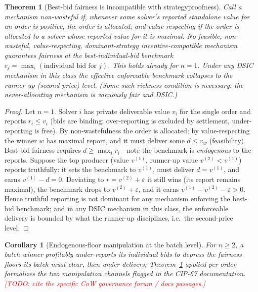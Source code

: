 \documentclass[11pt]{article}
\newcommand{\todo}[1]{\textcolor{red}{[TODO: #1]}}
\newtheorem{theorem}{Theorem}
\newtheorem{corollary}{Corollary}
\theoremstyle{remark}
\begin{document}
\begin{theorem}[Best-bid fairness is incompatible with strategyproofness]
\label{thm:incompat}
Call a mechanism \emph{non-wasteful} if, whenever some solver's reported
standalone value for an order is positive, the order is allocated; and
\emph{value-respecting} if the order is allocated to a solver whose
reported value for it is maximal. No feasible, non-wasteful,
value-respecting, dominant-strategy incentive-compatible mechanism
guarantees fairness at the best-individual-bid benchmark
$c_j=\max_i(\text{individual bid for }j)$. This holds already for $n=1$.
Under any DSIC mechanism in this class the effective enforceable benchmark
collapses to the runner-up (second-price) level. (Some such richness
condition is necessary: the never-allocating mechanism is vacuously fair
and DSIC.)
\end{theorem}

\begin{proof}
Let $n=1$. Solver $i$ has private deliverable value $v_i$ for the single
order and reports $r_i\le v_i$ (bids are binding; over-reporting is
excluded by settlement, under-reporting is free). By non-wastefulness the
order is allocated; by value-respecting the winner $w$ has maximal report,
and it must deliver some $d\le v_w$ (feasibility). Best-bid fairness
requires $d\ge\max_i r_i$---note the benchmark is \emph{endogenous} to the
reports. Suppose the top producer (value $v^{(1)}$, runner-up value
$v^{(2)}<v^{(1)}$) reports truthfully: it sets the benchmark to $v^{(1)}$,
must deliver $d=v^{(1)}$, and earns $v^{(1)}-d=0$. Deviating to
$r=v^{(2)}+\varepsilon$ it still wins (its report remains maximal), the
benchmark drops to $v^{(2)}+\varepsilon$, and it earns
$v^{(1)}-v^{(2)}-\varepsilon>0$. Hence
truthful reporting is not dominant for any mechanism enforcing the best-bid
benchmark; and in any DSIC mechanism in this class, the enforceable
delivery is bounded by what the runner-up disciplines, i.e.\ the
second-price level.
\end{proof}

\begin{corollary}[Endogenous-floor manipulation at the batch level]
\label{cor:batchmanip}
For $n\ge2$, a batch winner profitably under-reports its \emph{individual}
bids to depress the fairness floors its batch must clear, then
under-delivers; Theorem~\ref{thm:incompat} applied per order formalizes the
two manipulation channels flagged in the CIP-67 documentation.
\todo{cite the specific CoW governance forum / docs passages.}
\end{corollary}
\end{document}
